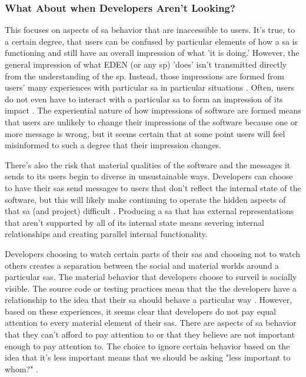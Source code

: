 \documentclass[a4paper,man,natbib,floatsintext]{apa6}
\begin{document}
   \subsubsection{What About when Developers Aren't Looking?}
   This focuses on aspects of \gls{sa} behavior that are inaccessible to users. It's true, to a certain degree, that users can be confused by particular elements of how a \gls{sa} is functioning and still have an overall impression of what 'it is doing.' However, the general impression of what \gls{EDEN} (or any \gls{sp}) 'does' isn't transmitted directly from the understanding of the \gls{sp}. Instead, those impressions are formed from users' many experiences with particular \gls{sa} in particular situations \citep{Boellstorff2015-al,Eubanks2018-hc,Schull2012-nc}. Often, users do not even have to interact with a particular \gls{sa} to form an impression of its impact \citep{Kitchin2011-af}. The experiential nature of how impressions of software are formed means that users are unlikely to change their impressions of the software because one or more message is wrong, but it seems certain that at some point users will feel misinformed to such a degree that their impression changes.

   There's also the risk that material qualities of the software and the messages it sends to its users begin to diverse in unsustainable ways. Developers can choose to have their \glspl{sa} send messages to users that don't reflect the internal state of the software, but this will likely make continuing to operate the hidden aspects of that \gls{sa} (and project) difficult \citep{Bivens2017-tc}. Producing a \gls{sa} that has external representations that aren't supported by all of its internal state means severing internal relationships and creating parallel internal functionality. 

   Developers choosing to watch certain parts of their \glspl{sa} and choosing not to watch others creates a separation between the social and material worlds around a particular \glspl{sa}. The material behavior that developers choose to surveil is socially visible. The source code or testing practices mean that the the developers have a relationship to the idea that their \gls{sa} should behave a particular way \citep{Mackenzie2006-hb}. However, based on these experiences, it seems clear that developers do not pay equal attention to every material element of their \glspl{sa}. There are aspects of \gls{sa} behavior that they can't afford to pay attention to or that they believe are not important enough to pay attention to. The choice to ignore certain behavior based on the idea that it's less important means that we should be asking "less important to whom?" \citep{Harding1992-od,Haraway1988-nh}. 
\end{document}
